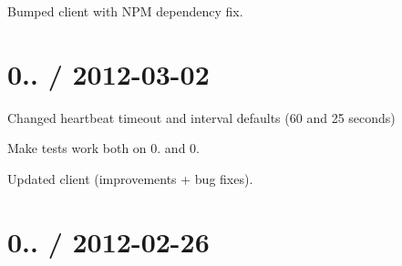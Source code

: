 \begin{DoxyItemize}
\item Bumped client with N\+PM dependency fix.
\end{DoxyItemize}

\section*{0.. / 2012-\/03-\/02 }


\begin{DoxyItemize}
\item Changed heartbeat timeout and interval defaults (60 and 25 seconds)
\item Make tests work both on 0. and 0.
\item Updated client (improvements + bug fixes).
\end{DoxyItemize}

\section*{0.. / 2012-\/02-\/26 }


